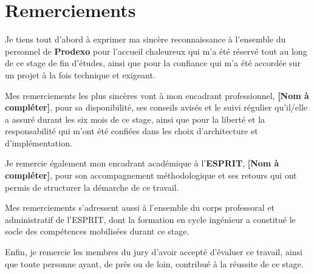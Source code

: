 \chapter*{Remerciements}

Je tiens tout d'abord à exprimer ma sincère reconnaissance à l'ensemble du personnel de \textbf{Prodexo} pour l'accueil chaleureux qui m'a été réservé tout au long de ce stage de fin d'études, ainsi que pour la confiance qui m'a été accordée sur un projet à la fois technique et exigeant.

Mes remerciements les plus sincères vont à mon encadrant professionnel, \textbf{[Nom à compléter]}, pour sa disponibilité, ses conseils avisés et le suivi régulier qu'il/elle a assuré durant les six mois de ce stage, ainsi que pour la liberté et la responsabilité qui m'ont été confiées dans les choix d'architecture et d'implémentation.

Je remercie également mon encadrant académique à l'\textbf{ESPRIT}, \textbf{[Nom à compléter]}, pour son accompagnement méthodologique et ses retours qui ont permis de structurer la démarche de ce travail.

Mes remerciements s'adressent aussi à l'ensemble du corps professoral et administratif de l'ESPRIT, dont la formation en cycle ingénieur a constitué le socle des compétences mobilisées durant ce stage.

Enfin, je remercie les membres du jury d'avoir accepté d'évaluer ce travail, ainsi que toute personne ayant, de près ou de loin, contribué à la réussite de ce stage.
